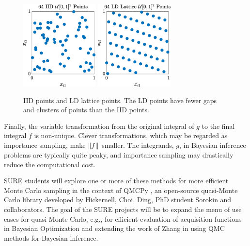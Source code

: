 \begin{figure}
	\centering
	\includegraphics[height = 4.5cm]{IIDPoints.eps} \quad
	\includegraphics[height = 4.5cm]{ShiftedLatticePoints.eps}
	\caption{IID points and LD lattice points.  The LD points have fewer gaps and clusters of points than the IID points. \label{fig:iid_vs_ld}}
\end{figure}


Finally, the variable transformation from the original integral of $g$ to the final integral $f$ is non-unique.  Clever transformations, which may be regarded as importance sampling, make $\left \lVert f \right \rVert_{{}}$ smaller.  The integrands, $g$, in Bayesian inference problems are typically quite peaky, and importance sampling may drastically reduce the computational cost.

SURE students will explore one or more of these methods for more efficient Monte Carlo sampling in the context of QMCPy \cite{QMCPy2020a,QMCBlog}, an open-source quasi-Monte Carlo library developed by Hickernell, Choi, Ding, PhD student Sorokin and collaborators. The goal of the SURE projects will be to expand the menu of use cases for quasi-Monte Carlo, e.g., for efficient evaluation of acquisition functions in Bayesian Optimization and extending the work of Zhang \cite{Zha21a} in using QMC methods for Bayesian inference. 